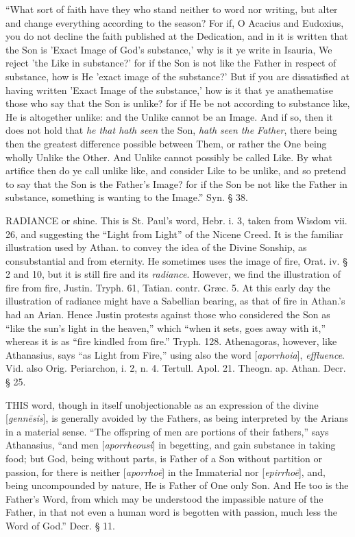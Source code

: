 ``What sort of faith have they who stand neither
to word nor writing, but alter and change everything according to the
season? For if, O Acacius and Eudoxius, you do not decline the faith
published at the Dedication, and in it is written that the Son is
'Exact Image of God's substance,' why is it ye write in Isauria, We
reject 'the Like in substance?' for if the Son is not like the Father
in respect of substance, how is He 'exact image of the substance?' But
if you are dissatisfied at having written 'Exact Image of the
substance,' how is it that ye anathematise those who say that the Son
is unlike? for if He be not according to substance like, He is
altogether unlike: and the Unlike cannot be an Image. And if so, then
it does not hold that \emph{he that hath seen} the Son, \emph{hath seen
the Father}, there being then the greatest difference possible
between Them, or rather the One being wholly Unlike the Other. And
Unlike cannot possibly be called Like. By what artifice then do ye
call unlike like, and consider Like to be unlike, and so pretend to
say that the Son is the Father's Image? for if the Son be not like the
Father in substance, something is wanting to the Image.'' Syn. § 38.

\xsection{[Apaugasma]}

RADIANCE
or shine. This is St. Paul's word, Hebr. i. 3, taken from Wisdom vii.
26, and suggesting the ``Light from Light'' of the Nicene Creed. It is
the familiar illustration used by Athan. to convey the idea of the
Divine Sonship, as consubstantial and from eternity. He sometimes uses
the image of fire, Orat. iv. § 2 and 10, but it is still fire and its
\emph{radiance}. However, we find the illustration of fire from fire,
Justin. Tryph. 61, Tatian. contr. Græc. 5. At this early day the
illustration of radiance might have a Sabellian bearing, as that of
fire in Athan.'s had an Arian. Hence Justin protests against those who
considered the Son as ``like the sun's light in the heaven,'' which ``when
it sets, goes away with it,'' whereas it is as ``fire kindled from fire.''
Tryph. 128. Athenagoras, however, like Athanasius, says ``as Light from
Fire,'' using also the word [\emph{aporrhoia}], \emph{effluence}. Vid.
also Orig. Periarchon, i. 2, n. 4. Tertull. Apol. 21. Theogn. ap.
Athan. Decr. § 25.

\xsection{[Aporrhoe]}

THIS
word, though in itself unobjectionable as an expression of the divine
[\emph{genn\={e}sis}], is generally avoided by the Fathers, as
being interpreted by the Arians in a material sense. ``The offspring of
men are portions of their fathers,'' says Athanasius, ``and men [\emph{aporrheousi}]
in begetting, and gain substance in taking food; but God, being
without parts, is Father of a Son without partition or passion, for
there is neither [\emph{aporrho\={e}}] in the Immaterial nor [\emph{epirrho\={e}}],
and, being uncompounded by nature, He is Father of One only Son. And
He too is the Father's Word, from which may be understood the
impassible nature of the Father, in that not even a human word is
begotten with passion, much less the Word of God.'' Decr. § 11.

